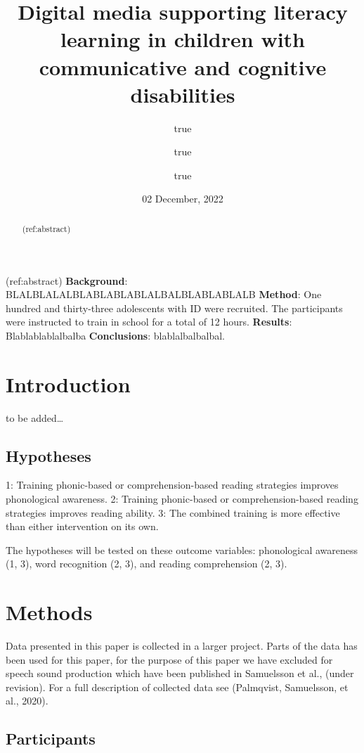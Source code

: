 \documentclass[
]{article}
\title{Digital media supporting literacy learning in children with
communicative and cognitive disabilities}
\author{true \and true \and true}
\date{02 December, 2022}
\begin{document}
\maketitle
\begin{abstract}
(ref:abstract)
\end{abstract}

(ref:abstract) \textbf{Background}:
BLALBLALALBLABLABLABLALBALBLABLABLALB \textbf{Method}: One hundred and
thirty-three adolescents with ID were recruited. The participants were
instructed to train in school for a total of 12 hours. \textbf{Results}:
Blablablablalbalba \textbf{Conclusions}: blablalbalbalbal.

\hypertarget{introduction}{%
\section{Introduction}\label{introduction}}

to be added\ldots{}

\hypertarget{hypotheses}{%
\subsection{Hypotheses}\label{hypotheses}}

1: Training phonic-based or comprehension-based reading strategies
improves phonological awareness. 2: Training phonic-based or
comprehension-based reading strategies improves reading ability. 3: The
combined training is more effective than either intervention on its own.

The hypotheses will be tested on these outcome variables: phonological
awareness (1, 3), word recognition (2, 3), and reading comprehension (2,
3).

\hypertarget{methods}{%
\section{Methods}\label{methods}}

Data presented in this paper is collected in a larger project. Parts of
the data has been used for this paper, for the purpose of this paper we
have excluded for speech sound production which have been published in
Samuelsson et al., (under revision). For a full description of collected
data see (Palmqvist, Samuelsson, et al., 2020).

\hypertarget{participants}{%
\subsection{Participants}\label{participants}}
\end{document}

